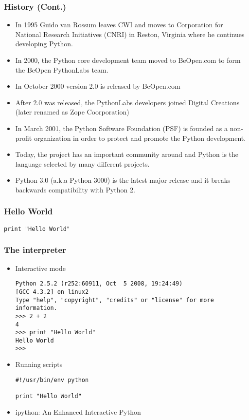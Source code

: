 \begin{frame}
  \frametitle{History (Cont.)}

  \begin{itemize}
  \item In 1995 Guido van Rossum leaves CWI and moves to Corporation
    for National Research Initiatives (CNRI) in Reston, Virginia where
    he continues developing Python.
  \item In 2000, the Python core development team moved to BeOpen.com
    to form the BeOpen PythonLabs team.
  \item In October 2000 version 2.0 is released by BeOpen.com
  \item After 2.0 was released, the PythonLabs developers joined
    Digital Creations (later renamed as Zope Coorporation)
  \item In March 2001, the Python Software Foundation (PSF) is founded
    as a non-profit organization in order to protect and promote the
    Python development.
  \item Today, the project has an important community around and
    Python is the language selected by many different projects.
  \item Python 3.0 (a.k.a Python 3000) is the latest major release 
    and it breaks backwards compatibility with Python 2.
  \end{itemize}
\end{frame}

\begin{frame}[fragile]
  \frametitle{Hello World}
{\huge
\begin{verbatim}
print "Hello World"
\end{verbatim}
}
\end{frame}

\begin{frame}[fragile]
  \frametitle{The interpreter}

  \begin{itemize}
  \item Interactive mode
{\scriptsize
\begin{verbatim}
Python 2.5.2 (r252:60911, Oct  5 2008, 19:24:49) 
[GCC 4.3.2] on linux2
Type "help", "copyright", "credits" or "license" for more information.
>>> 2 + 2
4
>>> print "Hello World"
Hello World
>>>
\end{verbatim}
}
\item Running scripts
{\scriptsize
\begin{verbatim}
#!/usr/bin/env python

print "Hello World"
\end{verbatim}
}

\item ipython: An Enhanced Interactive Python
\end{itemize}
\end{frame}

